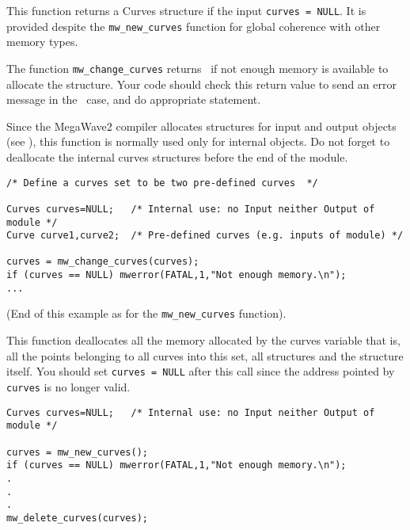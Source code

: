 \Description
This function returns a Curves structure if the input \verb+curves = NULL+.
It is provided despite the \verb+mw_new_curves+ function for
global coherence with other memory types.

The function \verb+mw_change_curves+ returns \Null\ if not enough memory is available to allocate the structure. 
Your code should check this return value to send an error message in the \Null\ case, and do appropriate statement.

Since the MegaWave2 compiler allocates structures for input and output 
objects (see \volI), this function is normally used only for internal objects.
Do not forget to deallocate the internal curves structures before the end
of the module.

\Next
\Example
\begin{verbatim}
/* Define a curves set to be two pre-defined curves  */

Curves curves=NULL;   /* Internal use: no Input neither Output of module */
Curve curve1,curve2;  /* Pre-defined curves (e.g. inputs of module) */

curves = mw_change_curves(curves);
if (curves == NULL) mwerror(FATAL,1,"Not enough memory.\n");
...
\end{verbatim}
(End of this example as for the \verb+mw_new_curves+ function).


\newpage %


\Description
This function deallocates all the memory allocated by the curves variable
that is, all the points belonging to all curves into this set, all \curve structures and the \curves structure itself.
You should set \verb+curves = NULL+ after this call since the address pointed
by \verb+curves+ is no longer valid.

\Next
\Example
\begin{verbatim}
Curves curves=NULL;   /* Internal use: no Input neither Output of module */

curves = mw_new_curves();
if (curves == NULL) mwerror(FATAL,1,"Not enough memory.\n");
.
.
.
mw_delete_curves(curves);
\end{verbatim}

\newpage %


